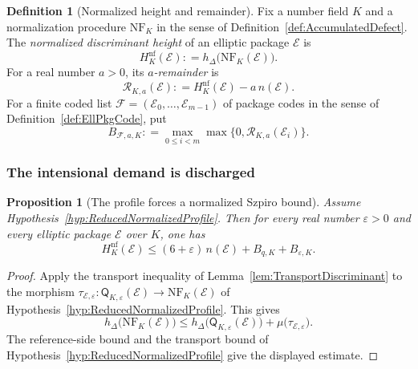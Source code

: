\documentclass[10pt, reqno]{amsart}
\theoremstyle{plain}
\newtheorem{proposition}[theorem]{Proposition}
\theoremstyle{definition}
\newtheorem{definition}[theorem]{Definition}
\theoremstyle{plain}
\newcommand{\coloneqq}{\mathrel{\mathop:}=}
\begin{document}
\begin{definition}[Normalized height and remainder]
\label{def:NormalizedHeightRemainder}
Fix a number field $K$ and a normalization procedure $\mathrm{NF}_{K}$ in the sense of Definition~\ref{def:AccumulatedDefect}. The \emph{normalized discriminant height} of an elliptic package $\mathcal{E}$ is
\[
  H^{\mathrm{nf}}_{K}(\mathcal{E})
  \coloneqq
  h_{\Delta}\bigl(\mathrm{NF}_{K}(\mathcal{E})\bigr).
\]
For a real number $a>0$, its \emph{$a$-remainder} is
\[
  \mathcal{R}_{K,a}(\mathcal{E})
  \coloneqq
  H^{\mathrm{nf}}_{K}(\mathcal{E})-a\,n(\mathcal{E}).
\]
For a finite coded list $\mathcal{F}=(\mathcal{E}_{0},\ldots,\mathcal{E}_{m-1})$ of package codes in the sense of Definition~\ref{def:EllPkgCode}, put
\[
  B_{\mathcal{F},a,K}
  \coloneqq
  \max_{0\le i<m}
  \max\bigl\{0,\mathcal{R}_{K,a}(\mathcal{E}_{i})\bigr\}.
\]
\end{definition}

\subsubsection{The intensional demand is discharged}\label{subsubsec:IntensionalDemandFree}

\begin{proposition}[The profile forces a normalized Szpiro bound]
\label{prop:ReducedProfileForcesNormalizedSzpiro}
Assume Hypothesis~\ref{hyp:ReducedNormalizedProfile}. Then for every real number $\varepsilon>0$ and every elliptic package $\mathcal{E}$ over $K$, one has
\[
  H^{\mathrm{nf}}_{K}(\mathcal{E})
  \le
  (6+\varepsilon)\,n(\mathcal{E})+B_{q,K}+B_{\varepsilon,K}.
\]
\end{proposition}

\begin{proof}
Apply the transport inequality of Lemma~\ref{lem:TransportDiscriminant} to the morphism $\tau_{\mathcal{E},\varepsilon}\colon\mathsf{Q}_{K,\varepsilon}(\mathcal{E})\to\mathrm{NF}_{K}(\mathcal{E})$ of Hypothesis~\ref{hyp:ReducedNormalizedProfile}. This gives
\[
  h_{\Delta}\bigl(\mathrm{NF}_{K}(\mathcal{E})\bigr)
  \le
  h_{\Delta}\bigl(\mathsf{Q}_{K,\varepsilon}(\mathcal{E})\bigr)
  +
  \mu\bigl(\tau_{\mathcal{E},\varepsilon}\bigr).
\]
The reference-side bound and the transport bound of Hypothesis~\ref{hyp:ReducedNormalizedProfile} give the displayed estimate.
\end{proof}
\end{document}
